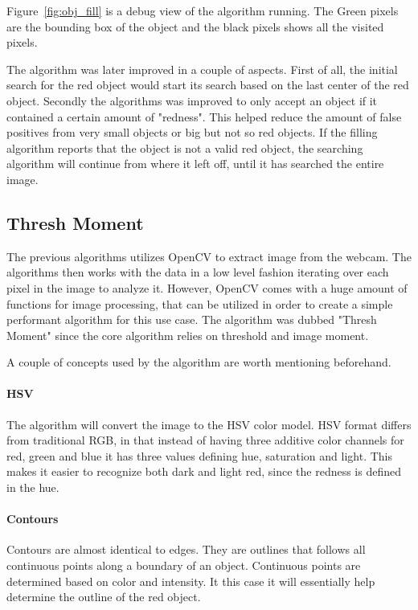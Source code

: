 Figure~\ref{fig:obj_fill} is a debug view of the algorithm running.
The Green pixels are the bounding box of the object and the black pixels shows all the visited pixels.


The algorithm was later improved in a couple of aspects.
First of all, the initial search for the red object would start its search based on the last center of the red object.
Secondly the algorithms was improved to only accept an object if it contained a certain amount of "redness".
This helped reduce the amount of false positives from very small objects or big but not so red objects.
If the filling algorithm reports that the object is not a valid red object, the searching algorithm will continue from where it left off, until it has searched the entire image.

\subsection{Thresh Moment}

The previous algorithms utilizes OpenCV to extract image from the webcam. 
The algorithms then works with the data in a low level fashion iterating over each pixel in the image to analyze it.
However, OpenCV comes with a huge amount of functions for image processing, that can be utilized in order to create a simple performant algorithm for this use case. 
The algorithm was dubbed "Thresh Moment" since the core algorithm relies on threshold and image moment.

A couple of concepts used by the algorithm are worth mentioning beforehand.

\paragraph{HSV}
The algorithm will convert the image to the HSV color model.
HSV format differs from traditional RGB, in that instead of having three additive color channels for red, green and blue it has three values defining hue, saturation and light.
This makes it easier to recognize both dark and light red, since the redness is defined in the hue.

\paragraph{Contours}
Contours are almost identical to edges.
They are outlines that follows all continuous points along a boundary of an object.
Continuous points are determined based on color and intensity.
It this case it will essentially help determine the outline of the red object.\cite{contours}

